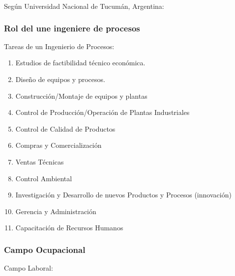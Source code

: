             Según Universidad Nacional de Tucumán, Argentina:
            
            \begin{quote}
                \textit{}
            \end{quote}
        
        \subsubsection{Rol del une ingeniere de procesos}
        
        Tareas de un Ingenierio de Procesos:
        
        \begin{multicols}{2}
            \begin{enumerate}
                \item Estudios de factibilidad técnico económica.
                \item Diseño de equipos y procesos.
                \item Construcción/Montaje de equipos y plantas
                \item Control de Producción/Operación de Plantas Industriales
                \item Control de Calidad de Productos
                \item Compras y Comercialización
                \item Ventas Técnicas
                \item Control Ambiental
                \item Investigación y Desarrollo de nuevos Productos y Procesos (innovación)
                \item Gerencia y Administración
                \item Capacitación de Recursos Humanos
            \end{enumerate}
        \end{multicols}
        
        \subsubsection{Campo Ocupacional}
        
        Campo Laboral:
        
